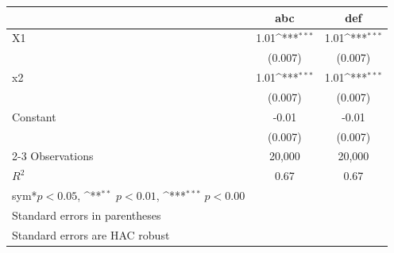 \def\sym#1{\ifmmode^{#1}\else\(^{#1}\)\fi}
\begin{tabular}{lcc} \hline\midrule
                    &abc                 &def                 \\ 
\midrule
X1                  &   1.01\sym{***}    &   1.01\sym{***}    \\ 
                    &      (0.007)       &      (0.007)       \\
[1em]
x2                  &   1.01\sym{***}    &   1.01\sym{***}    \\ 
                    &      (0.007)       &      (0.007)       \\
[1em]
Constant            &       -0.01        &       -0.01        \\ 
                    &      (0.007)       &      (0.007)       \\\cmidrule(lr){2-3}
Observations        &       20,000       &       20,000       \\
$R^2$               &        0.67        &        0.67        \\

\midrule
\multicolumn{}{l}{\footnotesize sym{*}\(p<0.05\), \sym{**} \(p<0.01\), \sym{***} \(p<0.00\)} \\
\multicolumn{3}{l}{\footnotesize Standard errors in parentheses} \\
\multicolumn{3}{l}{\footnotesize Standard errors are HAC robust} \\
\hline\midrule
\end{tabular}
